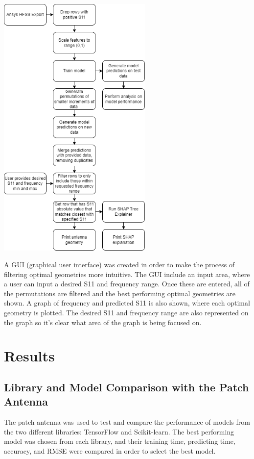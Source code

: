 \documentclass[lettersize,journal]{IEEEtran}
\newenvironment{Figure}
    {\par\medskip\noindent\minipage{\linewidth}}
    {\endminipage\par\medskip}
\begin{document}
\begin{Figure}
\centering
\includegraphics[width=3.0in]{methodology}
\label{data_flow}
\end{Figure}

A GUI (graphical user interface) was created in order to make the process of filtering optimal geometries more intuitive. The GUI include an input area, where a user can input a desired S11 and frequency range. Once these are entered, all of the permutations are filtered and the best performing optimal geometries are shown. A graph of frequency and predicted S11 is also shown, where each optimal geometry is plotted. The desired S11 and frequency range are also represented on the graph so it's clear what area of the graph is being focused on.


\section{Results}
\subsection{Library and Model Comparison with the Patch Antenna}
The patch antenna was used to test and compare the performance of models from the two different libraries: TensorFlow and Scikit-learn. The best performing model was chosen from each library, and their training time, predicting time, accuracy, and RMSE were compared in order to select the best model.
\end{document}
